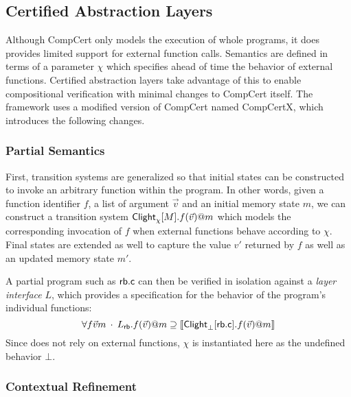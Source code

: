 \documentclass[acmsmall,review,anonymous]{acmart}\settopmatter{printfolios=true,printccs=false,printacmref=false}
\begin{document}

\subsection{Certified Abstraction Layers} %

Although CompCert only models the execution of whole programs,
it does provides limited support for external function calls.
Semantics are defined in terms of a parameter $\chi$
which specifies ahead of time the behavior of external functions.
Certified abstraction layers \cite{popl15}
take advantage of this to enable compositional verification
with minimal changes to CompCert itself.
The framework uses a modified version of CompCert named CompCertX,
which introduces the following changes.

\subsubsection{Partial Semantics}

First,
transition systems are generalized so that
initial states can be constructed
to invoke an arbitrary function within the program.
In other words, given
a function identifier $f$,
a list of argument $\vec{v}$ and
an initial memory state $m$,
we can construct a transition system
$ \mathsf{Clight} _\chi[M].f(\vec{v})@m$
which models the corresponding invocation of $f$
when external functions behave according to $\chi$.
Final states are extended as well
to capture the value $v'$ returned by $f$
as well as an updated memory state $m'$.

A partial program such as $ \mathsf{rb.c} $
can then be verified in isolation against a \emph{layer interface} $L$,
which provides a specification for the behavior of the program's individual functions:
\begin{equation} \label{eqn:rbverif}
  \forall f \vec{v} m \:\cdot\:
    L_{ \mathsf{rb} }.f(\vec{v})@m \supseteq
    \llbracket  \mathsf{Clight} _\bot[ \mathsf{rb.c} ].f(\vec{v})@m \rrbracket
\end{equation}
Since  does not rely on external functions,
$\chi$ is instantiated here as the undefined behavior $\bot$.

\subsubsection{Contextual Refinement}
\end{document}
